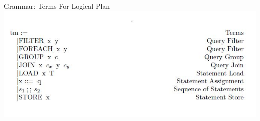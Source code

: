 \begin{frame}{Grammar: Terms For Logical Plan}
\centering
\includegraphics[scale=0.6]{Images/Grammar/Terms.JPG}
\end{frame}



